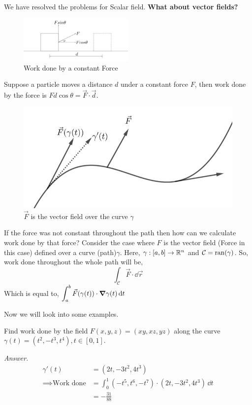 \documentclass[../Analysis-3.tex]{subfiles}
\begin{document}
We have resolved the problems for Scalar field. \textbf{What about vector fields?}
\begin{figure}[H]
  \centering
  \includegraphics[width=0.5\textwidth]{../figures/lec-23.2.png}
  \caption{Work done by a constant Force}
\end{figure}
Suppose a particle moves a distance $d$ under a constant force $F$, then work done by the force is $Fd\cos{\theta} = \vec{F}\cdot\vec{d}$.


\begin{figure}
  \centering
  \includegraphics[width=.98\linewidth]{../figures/lec-23.3.png}
  \caption{$\vec{F}$ is the vector field over the curve $\gamma$}
\end{figure}

If the force was not constant throughout the path then how can we calculate work done by that force?
Consider the case where $F$ is the vector field (Force in this case) defined over a curve (path)$\gamma$. Here, $\gamma : [a,b] \to \mathbb{R}^n$ and $\mathcal{C} = \operatorname{ran}(\gamma)$. So, work done throughout the whole path will be,
\[\int_{\mathcal{C}} \vec{F}\cdot \dd\vec{r}\]
Which is equal to, $\displaystyle\int_a^b \vec{F}(\gamma(t))\cdot \grad \gamma(t)\, \dd t$

Now we will look into some examples.

\begin{Eg}{}{}
  Find work done by the field $F(x,y,z) = (xy,xz,yz)$ along the curve $\gamma(t) = (t^2,-t^3,t^4),t \in [0,1]$.

  \textit{Answer.} \begin{align*}
    \gamma'(t)
                              & = (2t,-3t^2,4t^3)                                      \\
    \implies \text{Work done} & = \int_0^1 (-t^5,t^6,-t^7)\cdot(2t,-3t^2,4t^3)\, \dd t \\
                              & = -\frac{31}{88}
  \end{align*}
\end{Eg}
\end{document}
